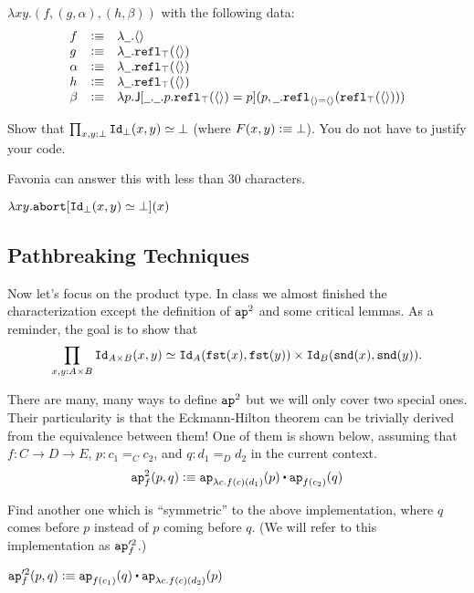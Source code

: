 \documentclass[12pt]{article}
\newcommand{\cut}[1]{}
\newcommand{\marksolution}[1]{\color{FireBrick}#1\normalcolor}%
\newcommand{\marksolution}[1]{\cut{#1}}%
\newenvironment{solution}{\trivlist \item[\hskip \labelsep{\bf
Solution:}]}{\endtrivlist}
\begin{document}
\marksolution{
  \begin{solution}
    $\lambda xy.(f,(g,\alpha),(h,\beta))$ with the following data:
    \[
      \begin{array}{lcl}
        f &\vcentcolon\equiv& \lambda \underline{\hspace{0.5em}} . \langle\rangle
        \\
        g &\vcentcolon\equiv& \lambda \underline{\hspace{0.5em}} . \mathtt{refl}_\top(\langle\rangle)
        \\
        \alpha &\vcentcolon\equiv& \lambda \underline{\hspace{0.5em}} . \mathtt{refl}_\top(\langle\rangle)
        \\
        h &\vcentcolon\equiv& \lambda \underline{\hspace{0.5em}} . \mathtt{refl}_\top(\langle\rangle)
        \\
        \beta &\vcentcolon\equiv& \lambda p . \mathsf{J}[\underline{\hspace{0.5em}}.\underline{\hspace{0.5em}}.p.\mathtt{refl}_\top(\langle\rangle)=p](p,\underline{\hspace{0.5em}}.\mathtt{refl}_{\langle\rangle=\langle\rangle}(\mathtt{refl}_\top(\langle\rangle)))
      \end{array}
    \]
  \end{solution}
}

\begin{task}
  Show that $\prod_{x,y:\bot} \mathtt{Id}_\bot(x,y) \simeq \bot$
  (where $F(x,y) \vcentcolon\equiv \bot$).
  You do not have to justify your code.
  \begin{hint}
    Favonia can answer this with less than 30 characters.
  \end{hint}
\end{task}

\marksolution{
  \begin{solution}
    $\displaystyle
      \lambda xy.\mathtt{abort}[\mathtt{Id}_\bot(x,y) \simeq \bot](x)
    $
  \end{solution}
}

\subsection{Pathbreaking Techniques}

Now let's focus on the product type.
In class we almost finished the characterization
except the definition of $\mathtt{ap}^2$ and some critical lemmas.
As a reminder, the goal is to show that
\[
  \prod_{x,y:A\times B} \mathtt{Id}_{A\times B}(x,y) \simeq \mathtt{Id}_A(\mathtt{fst}(x),\mathtt{fst}(y)) \times \mathtt{Id}_B(\mathtt{snd}(x),\mathtt{snd}(y)).
\]

There are many, many ways to define $\mathtt{ap}^2$
but we will only cover two special ones.
Their particularity is that the Eckmann-Hilton theorem
can be trivially derived from the equivalence between them!
One of them is shown below,
assuming that $f : C \to D \to E$,
$p : c_1 =_C c_2$, and $q : d_1 =_D d_2$
in the current context.
\[
  \ap^2_f(p,q) \defeq \ap_{\lambda c.f(c)(d_1)}(p) \concat \ap_{f(c_2)}(q)
\]
\begin{task}
  \label{task:ap2prime}
  Find another one which is ``symmetric'' to the above implementation,
  where $q$ comes before $p$ instead of $p$ coming before $q$.
  (We will refer to this implementation as $\mathtt{ap}'^2_f$.)
\end{task}
\marksolution{
  \begin{solution}
    $\displaystyle
    \ap'^2_f(p,q) \defeq \ap_{f(c_1)}(q) \concat \ap_{\lambda c.f(c)(d_2)}(p)
    $
  \end{solution}
}
\end{document}
